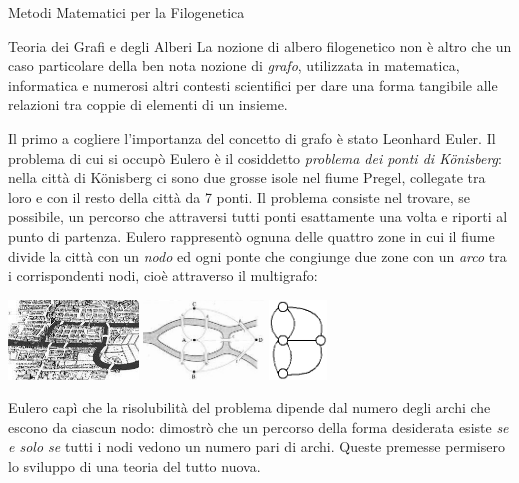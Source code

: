 \documentclass{article}
\begin{document}
\begin{section}{Metodi Matematici per la Filogenetica}
		\begin{subsection}{Teoria dei Grafi e degli Alberi}
			La nozione di albero filogenetico non è altro che un caso particolare della ben nota nozione di \emph{grafo}, utilizzata in matematica, informatica e numerosi altri contesti scientifici per dare una forma tangibile alle relazioni tra coppie di elementi di un insieme.
			
			Il primo a cogliere l’importanza del concetto di grafo è stato Leonhard Euler. Il problema di cui si occupò Eulero è il cosiddetto \emph{problema dei ponti di Könisberg}: nella città di Könisberg ci sono due grosse isole nel fiume Pregel, collegate tra loro e con il resto della città da 7 ponti. Il problema consiste nel trovare, se possibile, un percorso che attraversi tutti ponti esattamente una volta e riporti al punto di partenza.
			Eulero rappresentò ognuna delle quattro zone in cui il fiume divide la città con un \emph{nodo} ed ogni ponte che congiunge due zone con un \emph{arco} tra i corrispondenti nodi, cioè attraverso il multigrafo:
			\begin{center}
				\vspace{9pt}
				\hfill
				\includegraphics[height=60pt]{Pics/konisberg.png} \hfill
				\includegraphics[height=60pt]{Pics/konisberg1.png} \hfill
				\includegraphics[height=60pt]{Pics/multigrafo1.png}
				\hfill
				\vspace{9pt}
			\end{center}
		
			Eulero capì che la risolubilità del problema dipende dal numero degli archi che escono da ciascun nodo: dimostrò che un percorso della forma desiderata esiste \emph{se e solo se} tutti i nodi vedono un numero pari di archi. Queste premesse permisero lo sviluppo di una teoria del tutto nuova.
			

\end{subsection}
\end{section}
\end{document}
